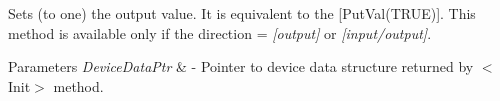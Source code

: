 Sets (to one) the output value. It is equivalent to the \mbox{[}Put\+Val(\+T\+R\+U\+E)\mbox{]}. This method is available only if the direction = {\itshape \mbox{[}output\mbox{]}} or {\itshape \mbox{[}input/output\mbox{]}}. 


\begin{DoxyParams}{Parameters}
{\em Device\+Data\+Ptr} & -\/ Pointer to device data structure returned by $<$\+Init$>$ method. \\
\hline
\end{DoxyParams}
